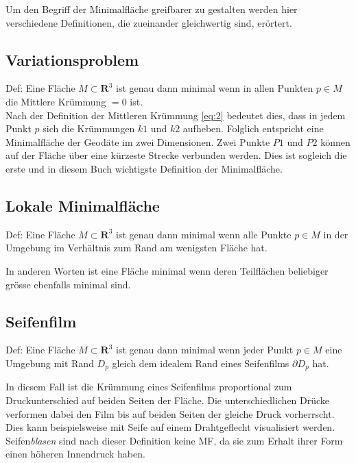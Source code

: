 \begin{refsection}
Um den Begriff der Minimalfläche greifbarer zu gestalten werden hier verschiedene Definitionen, die zueinander gleichwertig sind, erörtert.

\subsection{Variationsproblem}

Def: Eine Fläche $ \textit{M} \subset \mathbf{R}^{3} $ ist genau dann minimal wenn in allen Punkten $p \in M$ die Mittlere Krümmung $=0$ ist.\\
Nach der Definition der Mittleren Krümmung \ref{eq:2} bedeutet dies, dass in jedem Punkt $p$ sich die Krümmungen $k1$ und $k2$ aufheben.
Folglich entspricht eine Minimalfläche der Geodäte im zwei Dimensionen. Zwei Punkte $P1$ und $P2$ können auf der Fläche über eine kürzeste Strecke verbunden werden.  Dies ist sogleich die erste und in diesem Buch wichtigste Definition der Minimalfläche.

\subsection{Lokale Minimalfläche}

Def: Eine Fläche $ \textit{M} \subset \mathbf{R}^{3} $ ist genau dann minimal wenn alle Punkte $ p \in M $ in der Umgebung  im Verhältnis zum Rand am wenigsten Fläche hat.

In anderen Worten ist eine Fläche minimal wenn deren Teilflächen beliebiger grösse ebenfalls minimal sind.  

\subsection{Seifenfilm}

Def: Eine Fläche $ \textit{M} \subset \mathbf{R}^{3} $ ist genau dann minimal wenn jeder Punkt $p \in M$ eine Umgebung mit Rand $D_p$ gleich dem idealem Rand eines Seifenfilms $\partial D_p$ hat.

In diesem Fall ist die Krümmung eines Seifenfilms proportional zum Druckunterschied auf beiden Seiten der Fläche. Die unterschiedlichen Drücke verformen dabei den Film bis auf beiden Seiten der gleiche Druck vorherrscht. Dies kann beispielsweise mit Seife auf einem Drahtgeflecht visualisiert werden. Seifen\textit{blasen} sind nach dieser Definition keine MF, da sie zum Erhalt ihrer Form einen höheren Innendruck haben.


\end{refsection}
